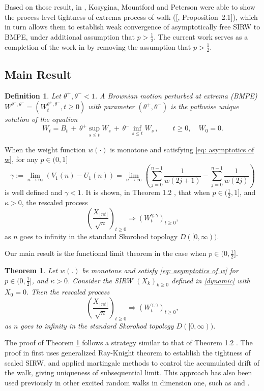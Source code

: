 \documentclass[twoside,12pt,a4paper]{article}
\newtheorem{theorem}{Theorem}[section]
\newtheorem{definition}{Definition}[section]
\numberwithin{equation}{section}
\begin{document}
	Based on those result, in \cite{KMP22}, Kosygina, Mountford and Peterson were able to show the process-level tightness of extrema process of walk ([\cite{KMP22}, Proposition~2.1]), which in turn allows them to establish weak convergence of asymptotically free SIRW to BMPE, under additional assumption that $p > \frac{1}{2}$. The current work serves as a completion of the work in \cite{KMP22} by removing the assumption that  $p > \frac{1}{2}$.

	
	

	\subsection{Main Result}
	\begin{definition}
		\label{defn:BMPE}
		Let $\theta^+, \theta^- <1$. A Brownian motion perturbed at
		extrema (BMPE) $W^{\theta^+, \theta^-} = \left(W^{\theta^+, \theta^-}_t, t\geq 0\right)$ with parameter  $(\theta^+, \theta^-)$ is the pathwise unique solution of the equation
		$$
		W_t = B_t \,+\, \theta^+ \sup_{s\leq t} W_s  \,+\, \theta^- \inf_{s\leq t} W_s \,,   \qquad t \ge 0, \quad W_0 = 0.
		$$
	\end{definition}
	When the weight function $w(\cdot )$ is monotone and satisfying \eqref{eq: asymptotics of w}, for any $p\in (0,1]$
	\begin{equation}\label{eq: gamma}
		\gamma:= \lim_{n\to \infty}\left( V_1(n) - U_1(n) \right) =\lim_{n\to \infty} \left( \sum_{j=0}^{n-1} \frac{1}{ w(2j+1)}-  \sum_{j=0}^{n-1}  \frac{1}{w(2j)} \right) 
	\end{equation}
	is well defined and $\gamma<1$. It is shown, in Theorem 1.2 \cite{KMP22}, that when $p\in (\frac{1}{2},1]$, and $\kappa >0 $, the rescaled process
	$$
	\left(  \frac{X_{\lfloor nt \rfloor }}{\sqrt{n}}  \right)_{t\geq 0} \Longrightarrow \left( W^{\gamma,\gamma}_{t}\right)_{t\geq 0},
	$$ as $n$ goes to infinity in the standard Skorohod topology $D([0,\infty) ).$
	
	Our main result is the functional limit theorem in the case when $p\in (0,\frac{1}{2}]$.
	\begin{theorem}\label{thm: main}
		Let $w(.)$ be monotone and satisfy \eqref{eq: asymptotics of w} for $p\in (0,\frac{1}{2}]$, and $\kappa >0 $. Consider the SIRW $(X_k)_{k\geq 0}$ defined in \eqref{dynamic} with $X_0 =0$. Then the rescaled process
		$$
		\left(  \frac{X_{\lfloor nt \rfloor }}{\sqrt{n}}  \right)_{t\geq 0} \Longrightarrow \left( W^{\gamma,\gamma}_{t}\right)_{t\geq 0},
		$$ as $n$ goes to infinity in the standard Skorohod topology $D([0,\infty) ).$
	\end{theorem}
	The proof of Theorem \ref{thm: main} follows a strategy similar to that of Theorem 1.2 \cite{KMP22}. The proof in \cite{KMP22} first uses generalized Ray-Knight theorem to establish the tightness of scaled SIRW, and applied martingale methods to control the accumulated drift of the walk, giving uniqueness of subsequential limit. 
	This approach
	has also been used previously in other excited random walks in dimension one, such as \cite{DK12} and \cite{KP16}.
\end{document}

